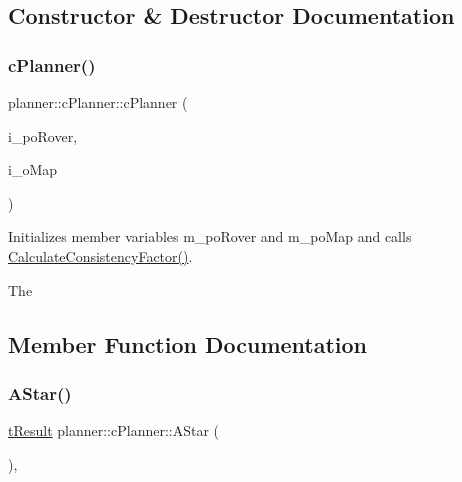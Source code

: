 \subsection{Constructor \& Destructor Documentation}
\mbox{\label{classplanner_1_1c_planner_a381d86c14532f65cf21cb80b4c64ce0e}} 
\subsubsection{\texorpdfstring{c\+Planner()}{cPlanner()}}
{\footnotesize\ttfamily planner\+::c\+Planner\+::c\+Planner (\begin{DoxyParamCaption}\item[{std\+::shared\+\_\+ptr$<$ \mbox{\hyperlink{classplanner_1_1c_rover_interface}{c\+Rover\+Interface}}$<$ 8 $>$$>$}]{i\+\_\+po\+Rover,  }\item[{std\+::shared\+\_\+ptr$<$ \mbox{\hyperlink{classplanner_1_1c_graph}{c\+Graph}} $>$}]{i\+\_\+o\+Map }\end{DoxyParamCaption})}



Initializes member variables m\+\_\+po\+Rover and m\+\_\+po\+Map and calls \mbox{\hyperlink{classplanner_1_1c_planner_a2e5a745f83f903662eff914d8beddb5e}{Calculate\+Consistency\+Factor()}}. 

The 

\subsection{Member Function Documentation}
\mbox{\label{classplanner_1_1c_planner_a341e70531266f023ac9461d18979d1ef}} 
\subsubsection{\texorpdfstring{A\+Star()}{AStar()}}
{\footnotesize\ttfamily \mbox{\hyperlink{structt_result}{t\+Result}} planner\+::c\+Planner\+::\+A\+Star (\begin{DoxyParamCaption}{ }\end{DoxyParamCaption})\hspace{0.3cm}{\ttfamily [protected]}, {\ttfamily [virtual]}}




